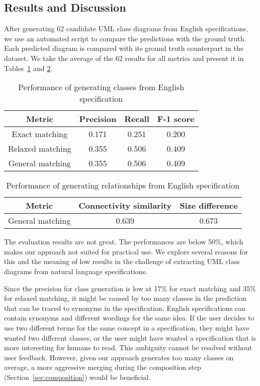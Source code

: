 \documentclass[sigconf]{acmart}
\begin{document}
\subsection{Results and Discussion}
After generating 62 candidate UML class diagrams from English specifications, we use an automated script to compare the predictions with the ground truth. Each predicted diagram is compared with its ground truth counterpart in the dataset. We take the average of the 62 results for all metrics and present it in Tables~\ref{tab:performance-classes} and \ref{tab:performance-rels}.

\begin{table}[h]
    \centering
    \begin{tabular}{|c|c|c|c|}
        \hline
        Metric & Precision & Recall & F-1 score \\ \hline
        Exact matching & 0.171 & 0.251 & 0.200 \\ \hline
        Relaxed matching & 0.355 & 0.506 & 0.409 \\ \hline
        General matching & 0.355 & 0.506 & 0.409 \\ \hline
    \end{tabular}
    \caption{Performance of generating classes from English specification}
    \label{tab:performance-classes}
\end{table}

\begin{table}[h]
    \centering
\begin{tabular}{|c|c|c|}
        \hline
        Metric & Connectivity similarity & Size difference \\ \hline
        General matching & 0.639 & 0.673 \\ \hline
    \end{tabular}
    
    \caption{Performance of generating relationships from English specification}
    \label{tab:performance-rels}
\end{table}

The evaluation results are not great. The performances are below 50\%, which makes our approach not suited for practical use. We explore several reasons for this and the meaning of low results in the challenge of extracting UML class diagrams from natural language specifications.

Since the precision for class generation is low at 17\% for exact matching and 35\% for relaxed matching, it might be caused by too many classes in the prediction that can be traced to synonyms in the specification. English specifications can contain synonyms and different wordings for the same idea. If the user decides to use two different terms for the same concept in a specification, they might have wanted two different classes, or the user might have wanted a specification that is more interesting for humans to read. This ambiguity cannot be resolved without user feedback. However, given our approach generates too many classes on average, a more aggressive merging during the composition step (Section~\ref{sec:composition}) would be beneficial.
\end{document}
